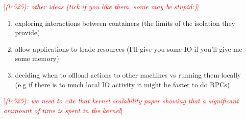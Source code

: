 \documentclass[letterpaper,twocolumn,10pt]{article}
\newcommand{\lnote}[1]{\textcolor{red}{[\textit{#1}]}} %
\begin{document}
\lnote{(lc525): other ideas (tick if you like them, some may be stupid:)}
\begin{enumerate}
\item exploring interactions between containers (the limits of the isolation they provide)
\item allow applications to trade resources (I'll give you some IO if you'll give me some memory)
\item deciding when to offload actions to other machines vs running them locally (e.g if there is to much local IO activity it might be faster to do RPCs)
\end{enumerate}
\lnote{(lc525): we need to cite that kernel scalability paper showing that a significant ammount of time is spent in the kernel}

{\footnotesize  }
\end{document}
